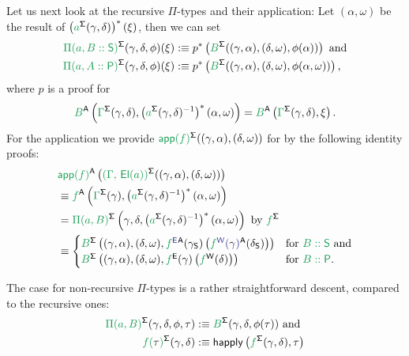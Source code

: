 \begin{defn}
Let us next look at the recursive $\Pi$-types and their application:
Let $(\alpha, \omega)$ be the result of
$\left(\grm{a}^\Sg(\gamma, \delta)\right)^*(\xi)$, then
we can set
\begin{align*}
\grm{\Pi(a, B :: \Sc)}^\Sg(\gamma, \delta, \phi)(\xi)
  &:\equiv p^*\left(\grm{B}^\Sg((\gamma, \alpha), (\delta, \omega), \phi(\alpha))\right)
    \text{ and} \\
\grm{\Pi(a, A :: \Pc)}^\Sg(\gamma, \delta, \phi)(\xi)
  &:\equiv p^*\left(\grm{B}^\Sg((\gamma, \alpha), (\delta, \omega), \phi(\alpha, \omega))\right)
    \text{,}
\end{align*}
where $p$ is a proof for
\begin{equation*}
\grm{B}^\CC\left(\grm{\Gamma}^\Sg(\gamma, \delta), \left(\grm{a}^\Sg(\gamma, \delta)\inv\right)^*(\alpha, \omega) \right)
  = \grm{B}^\CC\left(\grm{\Gamma}^\Sg(\gamma, \delta), \xi \right) \text{.}
\end{equation*}
For the application we provide 
$\grm{\IIapp(f)}^\Sg((\gamma, \alpha), (\delta, \omega))$ for
 by the following
identity proofs:
\begin{align*}
  & \grm{\IIapp(f)}^\CC\left(\grm{(\Gamma,\,\El(a))}^\Sg((\gamma, \alpha), (\delta, \omega))\right) \\
  &\equiv \grm{f}^\CC\left(\grm{\Gamma}^\Sg(\gamma), \left(\grm{a}^\Sg(\gamma, \delta)\inv\right)^*(\alpha, \omega)\right) \\
  &= \grm{\Pi(a, B)}^\Sg\left(\gamma, \delta, \left(\grm{a}^\Sg(\gamma, \delta)\inv\right)^*(\alpha, \omega)\right) \text{ by $\grm{f}^\Sg$}\\
  &\equiv 
    \begin{cases}
    \grm{B}^\Sg\left((\gamma, \alpha), (\delta, \omega),
    \tqm{\grm{f}^\EE }^\CC(\gamma_\Sc)
      \left(\tqm{\grm{f}^\WW(\blgamma)}^\CC(\delta_\Sc)\right)\right)
     & \text{for \grm{B :: \Sc} and} \\
    \grm{B}^\Sg\left((\gamma, \alpha), (\delta, \omega),
     \grm{f}^\EE(\gamma)\left(\grm{f}^\WW(\delta)\right)\right)
     & \text{for \grm{B :: \Pc}.}
    \end{cases}
\end{align*}

The case for non-recursive $\Pi$-types is a rather straightforward descent,
compared to the recursive ones:
\begin{align*}
\grm{\Pi(a, B)}^\Sg(\gamma, \delta, \phi, \tau)
  &:\equiv \grm{B}^\Sg(\gamma, \delta, \phi(\tau)) \text{ and}\\
\grm{f(\bltau)}^\Sg(\gamma, \delta)
  &:\equiv \happly\left(\grm{f}^\Sg(\gamma, \delta), \tau\right)
\end{align*}


\end{defn}
